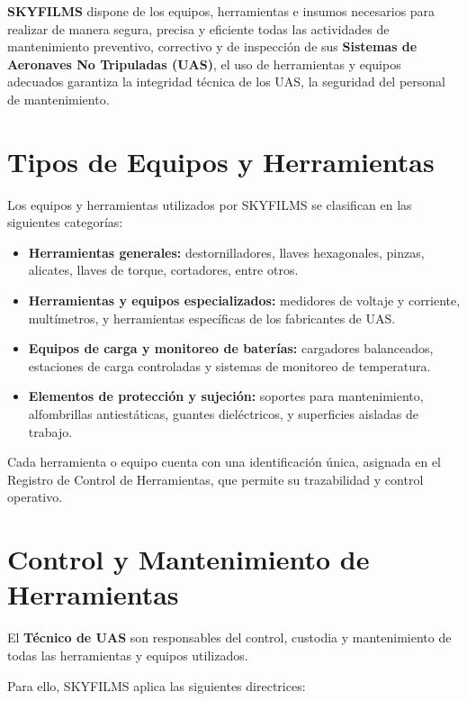 \textbf{SKYFILMS} dispone de los equipos, herramientas e insumos necesarios para realizar de manera segura, precisa y eficiente todas las actividades de mantenimiento preventivo, correctivo y de inspección de sus \textbf{Sistemas de Aeronaves No Tripuladas (UAS)}, el uso de herramientas y equipos adecuados garantiza la integridad técnica de los UAS, la seguridad del personal de mantenimiento.

\section{Tipos de Equipos y Herramientas}
Los equipos y herramientas utilizados por SKYFILMS se clasifican en las siguientes categorías:
\begin{itemize}
    \item \textbf{Herramientas generales:} destornilladores, llaves hexagonales, pinzas, alicates, llaves de torque, cortadores, entre otros.

    \item \textbf{Herramientas y equipos especializados:} medidores de voltaje y corriente, multímetros, y herramientas específicas de los fabricantes de UAS.

    \item \textbf{Equipos de carga y monitoreo de baterías:} cargadores balanceados, estaciones de carga controladas y sistemas de monitoreo de temperatura.

    \item \textbf{Elementos de protección y sujeción:} soportes para mantenimiento, alfombrillas antiestáticas, guantes dieléctricos, y superficies aisladas de trabajo.
\end{itemize}

Cada herramienta o equipo cuenta con una identificación única, asignada en el Registro de Control de Herramientas, que permite su trazabilidad y control operativo.\\

\section{Control y Mantenimiento de Herramientas}
El \textbf{Técnico de UAS} son responsables del control, custodia y mantenimiento de todas las herramientas y equipos utilizados.

Para ello, SKYFILMS aplica las siguientes directrices:

